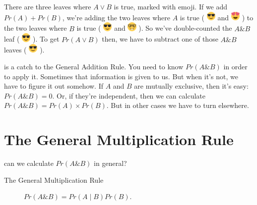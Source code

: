 \documentclass[justified]{tufte-book}
\newcommand{\given}{\mid}
\renewcommand{\wedge}{\mathbin{\&}}
\newcommand{\p}{Pr}
\theoremstyle{definition}
\theoremstyle{definition}
\theoremstyle{definition}
\theoremstyle{remark}
\begin{document}
There are three leaves where \(A \vee B\) is true, marked with emoji. If we add \(\p(A) + \p(B)\), we're adding the two leaves where \(A\) is true (
\includegraphics[width=0.18in]{img/emoji_shades_small} and
\includegraphics[width=0.18in]{img/emoji_hearts_small} ) to the two leaves where \(B\) is true (
\includegraphics[width=0.18in]{img/emoji_shades_small} and
\includegraphics[width=0.18in]{img/emoji_nerd_small} ). So we've double-counted the \(A \wedge B\) leaf (
\includegraphics[width=0.18in]{img/emoji_shades_small} ). To get \(\p(A \vee B)\) then, we have to subtract one of those \(A \wedge B\) leaves (
\includegraphics[width=0.18in]{img/emoji_shades_small} ).

 is a catch to the General Addition Rule. You need to know \(\p(A \wedge B)\) in order to apply it. Sometimes that information is given to us. But when it's not, we have to figure it out somehow. If \(A\) and \(B\) are mutually exclusive, then it's easy: \(\p(A \wedge B) = 0\). Or, if they're independent, then we can calculate \(\p(A \wedge B) = \p(A) \times \p(B)\). But in other cases we have to turn elsewhere.

\hypertarget{the-general-multiplication-rule}{%
\section{The General Multiplication Rule}\label{the-general-multiplication-rule}}

 can we calculate \(\p(A \wedge B)\) in general?

\begin{description}
\item[The General Multiplication Rule]
\(\p(A \wedge B) = \p(A \given B) \p(B).\)
\end{description}
\end{document}
